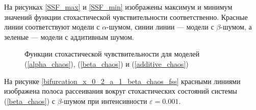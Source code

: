     На рисунках \ref{SSF_max} и \ref{SSF_min} изображены максимум и минимум значений функции стохастической чувствительности соответственно. Красные линии соответствуют модели с \(\alpha\)-шумом, синии линии --- модели с \(\beta\)-шумом, а зеленые --- модели с аддитивным шумом.

    \begin{figure}
        \centering
            
        \captionsetup{justification=centering}
        \caption{Функции стохастической чувствительности для моделей (\ref{alpha_chaos}), (\ref{beta_chaos}) и (\ref{additive_chaos})}
    \end{figure}
  
    На рисунке \ref{bifurcation_x_0_2_a_1_beta_chaos_fss} красными линиями изображена полоса рассеивания вокруг стохастических состояний системы (\ref{beta_chaos}) с \(\beta\)-шумом при интенсивности \(\varepsilon = 0.001\). 


